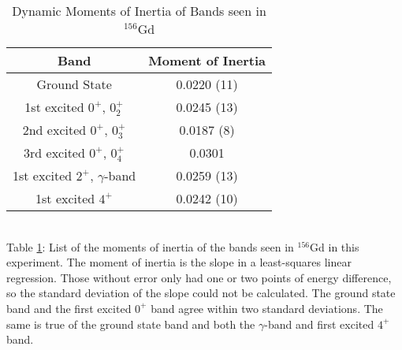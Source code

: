 \begin{table}[!]
    \centering
    \caption{Dynamic Moments of Inertia of Bands seen in $^{156}$Gd}
    \begin{tabular}{c|c}
        \toprule
        Band & Moment of Inertia  \\
        \hline
        Ground State & 0.0220 (11) \\
        1st excited $0^+$, $0^+_2$ & 0.0245 (13) \\
        2nd excited $0^+$, $0^+_3$ & 0.0187 (8) \\
        3rd excited $0^+$, $0^+_4$ & 0.0301 \\
        1st excited $2^+$, $\gamma$-band & 0.0259 (13) \\
        1st excited $4^+$ & 0.0242 (10)  \\
        \bottomrule
    \end{tabular}
    \\[2pt]
    \footnotesize
    \label{tab:156_Dynamic}
    Table \ref{tab:156_Dynamic}: List of the moments of inertia of the bands seen in $^{156}$Gd in this experiment. The moment of inertia is the slope in a least-squares linear regression. Those without error only had one or two points of energy difference, so the standard deviation of the slope could not be calculated. The ground state band and the first excited $0^+$ band agree within two standard deviations. The same is true of the ground state band and both the $\gamma$-band and first excited $4^+$ band.
\end{table}